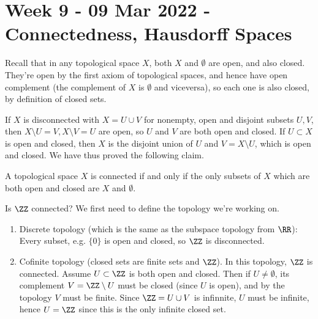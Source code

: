 \section{Week 9 - 09 Mar 2022 - Connectedness, Hausdorff Spaces }
Recall that in any topological space $X$, both $X$ and $\emptyset$ are open, and
also closed. They're open by the first axiom of topological spaces, and hence
have open complement (the complement of $X$ is $\emptyset$ and viceversa), so
each one is also closed, by definition of closed sets.

If $X$ is disconnected with $X=U\cup V$ for nonempty, open and disjoint subsets
$U, V$, then $X\setminus U = V, X\setminus V= U$ are open, so $U$ and $V$ are
both open and closed. If $U\subset X$ is open and closed, then $X$ is the
disjoint union of $U$ and $V=X\setminus U$, which is open and closed. We have
thus proved the following claim.
\begin{proposition}
  A topological space $X$ is connected if and only if the only subsets of $X$
  which are both open and closed are $X$ and $\emptyset$.
  \label{prop:openClosedSubsetsConnected}
\end{proposition}

\begin{example}
  Is $\ZZ$ connected? We first need to define the topology we're working on. 
  \begin{enumerate}
    \item Discrete topology (which is the same as the subspace topology from
      $\RR$): Every subset, e.g. $\{0\}$ is open and closed, so $\ZZ$ is
      disconnected.
    \item Cofinite topology (closed sets are finite sets and $\ZZ$). In this
      topology, $\ZZ$ is connected. Assume $U\subset\ZZ$ is both open and
      closed. Then if $U\neq \emptyset$, its complement $V=\ZZ\setminus U$ must
      be closed (since $U$ is open), and by the topology $V$ must be finite.
      Since $\ZZ=U\cup V$ is infinnite, $U$ must be infinite, hence $U=\ZZ$
      since this is the only infinite closed set.
  \end{enumerate}
\end{example}

